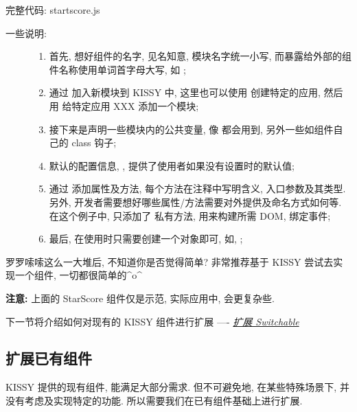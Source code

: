 \documentclass[letterpaper,10pt,english]{sphinxmanual}
\begin{document}
完整代码: startscore.js
\begin{description}
\item[{一些说明:}] \leavevmode\begin{enumerate}
\item {}
首先, 想好组件的名字, 见名知意, 模块名字统一小写, 而暴露给外部的组件名称使用单词首字母大写, 如 ;

\item {}
通过 {\hyperref[api/seed/loader/add.ver1.2:Loader.KISSY.add]{}} 加入新模块到 KISSY 中, 这里也可以使用  创建特定的应用, 然后用  给特定应用 XXX 添加一个模块;

\item {}
接下来是声明一些模块内的公共变量, 像  都会用到, 另外一些如组件自己的 class 钩子;

\item {}
默认的配置信息, , 提供了使用者如果没有设置时的默认值;

\item {}
通过 {\hyperref[api/seed/kissy/augment:Seed.KISSY.augment]{}} 添加属性及方法, 每个方法在注释中写明含义, 入口参数及其类型. 另外, 开发者需要想好哪些属性/方法需要对外提供及命名方式如何等. 在这个例子中, 只添加了  私有方法, 用来构建所需 DOM, 绑定事件;

\item {}
最后, 在使用时只需要创建一个对象即可, 如, ;

\end{enumerate}

\end{description}

罗罗嗦嗦这么一大堆后, 不知道你是否觉得简单? 非常推荐基于 KISSY 尝试去实现一个组件, 一切都很简单的\textasciicircum{}o\textasciicircum{}

\textbf{注意:} 上面的 StarScore 组件仅是示范, 实际应用中, 会更复杂些.

下一节将介绍如何对现有的 KISSY 组件进行扩展 ---- {\hyperref[quickstart/extendwidgets:quickstart-extendwidgets]{\emph{扩展 Switchable}}}


\subsection{扩展已有组件}
\label{quickstart/extendwidgets:id1}\label{quickstart/extendwidgets::doc}\label{quickstart/extendwidgets:quickstart-extendwidgets}
KISSY 提供的现有组件, 能满足大部分需求. 但不可避免地, 在某些特殊场景下, 并没有考虑及实现特定的功能. 所以需要我们在已有组件基础上进行扩展.
\end{document}
